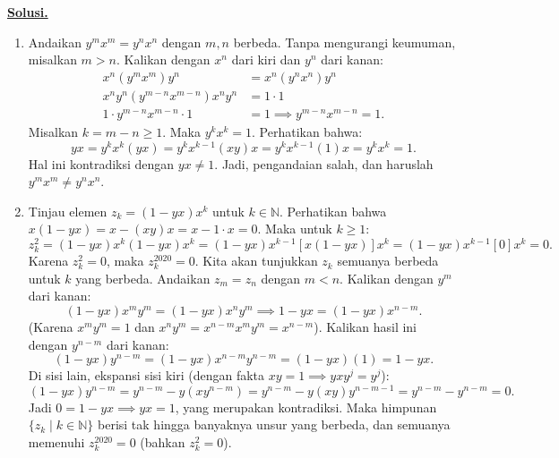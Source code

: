 \documentclass[12pt,twoside]{article}
\newenvironment{solution}
{
	\par\noindent\textbf{\underline{Solusi.}}\\
}
{
	\par
}
\begin{document}
\begin{enumerate}
        \begin{solution}
          \begin{enumerate}
            \item[(a)] Andaikan $y^m x^m = y^n x^n$ dengan $m, n$ berbeda. Tanpa mengurangi keumuman, misalkan $m > n$. Kalikan dengan $x^n$ dari kiri dan $y^n$ dari kanan:
                  \begin{align*}
                    x^n (y^m x^m) y^n                 & = x^n (y^n x^n) y^n               \\
                    x^n y^n (y^{m-n} x^{m-n}) x^n y^n & = 1 \cdot 1                       \\
                    1 \cdot y^{m-n} x^{m-n} \cdot 1   & = 1 \implies y^{m-n} x^{m-n} = 1.
                  \end{align*}
                  Misalkan $k = m-n \geq 1$. Maka $y^k x^k = 1$. Perhatikan bahwa:
                  \[ yx = y^k x^k (yx) = y^k x^{k-1} (xy) x = y^k x^{k-1} (1) x = y^k x^k = 1. \]
                  Hal ini kontradiksi dengan $yx \neq 1$. Jadi, pengandaian salah, dan haruslah $y^m x^m \neq y^n x^n$.

            \item[(b)] Tinjau elemen $z_k = (1 - yx)x^k$ untuk $k \in \mathbb{N}$.
                  Perhatikan bahwa $x(1-yx) = x - (xy)x = x - 1\cdot x = 0$.
                  Maka untuk $k \ge 1$:
                  \[ z_k^2 = (1-yx)x^k (1-yx)x^k = (1-yx)x^{k-1} [x(1-yx)] x^k = (1-yx)x^{k-1} [0] x^k = 0. \]
                  Karena $z_k^2 = 0$, maka $z_k^{2020} = 0$.
                  Kita akan tunjukkan $z_k$ semuanya berbeda untuk $k$ yang berbeda.
                  Andaikan $z_m = z_n$ dengan $m < n$. Kalikan dengan $y^m$ dari kanan:
                  \[ (1-yx)x^m y^m = (1-yx)x^n y^m \implies 1-yx = (1-yx)x^{n-m}. \]
                  (Karena $x^m y^m = 1$ dan $x^n y^m = x^{n-m} x^m y^m = x^{n-m}$).
                  Kalikan hasil ini dengan $y^{n-m}$ dari kanan:
                  \[ (1-yx)y^{n-m} = (1-yx)x^{n-m}y^{n-m} = (1-yx)(1) = 1-yx. \]
                  Di sisi lain, ekspansi sisi kiri (dengan fakta $xy=1 \implies yxy^j = y^j$):
                  \[ (1-yx)y^{n-m} = y^{n-m} - y(xy^{n-m}) = y^{n-m} - y(x y) y^{n-m-1} = y^{n-m} - y^{n-m} = 0. \]
                  Jadi $0 = 1-yx \implies yx=1$, yang merupakan kontradiksi.
                  Maka himpunan $\{z_k \mid k \in \mathbb{N}\}$ berisi tak hingga banyaknya unsur yang berbeda, dan semuanya memenuhi $z_k^{2020}=0$ (bahkan $z_k^2=0$).
          \end{enumerate}
        \end{solution}


\end{enumerate}
\end{document}
